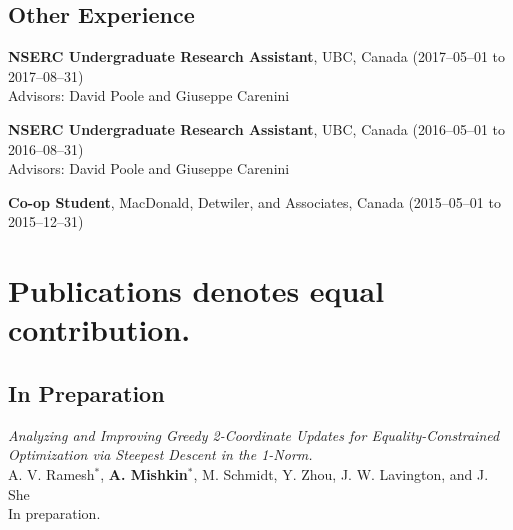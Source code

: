\documentclass[11pt, a4paper]{article}
\makeatletter
\gdef\tshortstack{\@ifnextchar[\@tshortstack{\@tshortstack[c]}}
\gdef\@tshortstack[#1]{%
  \leavevmode
  \vtop\bgroup
    \baselineskip-\p@\lineskip 3\p@
    \let\mb@l\hss\let\mb@r\hss
    \expandafter\let\csname mb@#1\endcsname\relax
    \let\\\@stackcr
    \@ishortstack}
\newcommand{\mitem}[1]{\item[\smash{\tshortstack[l]{#1}}]}
\newcommand{\mleftsize}{4.75em}
\makeatother
\begin{document}
\subsection{Other Experience}
\begin{description}[leftmargin=\mleftsize,style=nextline,font=\normalfont\space]
    \item[2017]
          \textbf{NSERC Undergraduate Research Assistant}, UBC, Canada  \hfill (2017--05--01 to 2017--08--31)
          \\
          Advisors: David Poole and Giuseppe Carenini
    \item[2016]
          \textbf{NSERC Undergraduate Research Assistant}, UBC, Canada  \hfill (2016--05--01 to 2016--08--31)
          \\
          Advisors: David Poole and Giuseppe Carenini
    \item[2015]
          \textbf{Co-op Student}, MacDonald, Detwiler, and Associates, Canada \hfill (2015--05--01 to 2015--12--31)
\end{description}

\section{Publications
  \texorpdfstring{\hfill {\normalfont\small * denotes equal contribution.}}{}
 }

\subsection{In Preparation}
\begin{description}[leftmargin=\mleftsize,style=nextline,font=\normalfont\space]
    \mitem{2026}
    \textit{Analyzing and Improving Greedy 2-Coordinate Updates for
        Equality-Constrained Optimization via Steepest Descent in the 1-Norm.}\\
    A. V. Ramesh$^{*}$, \textbf{A. Mishkin}$^{*}$, M. Schmidt, Y. Zhou, J. W.
    Lavington, and J. She\\
    In preparation.
\end{description}
\end{document}
